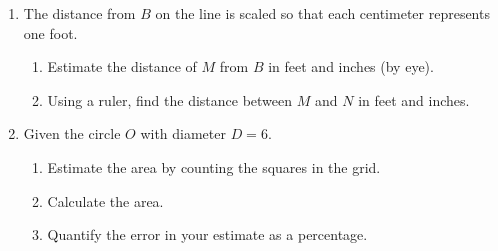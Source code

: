 \documentclass[12pt, twoside]{article}
\begin{document}
\begin{enumerate}
\item The distance from $B$ on the line is scaled so that each centimeter represents one foot. \\[15pt] %
  \begin{enumerate}
    \item Estimate the distance of $M$ from $B$ in feet and inches (by eye). \vspace{1cm} 
    \item Using a ruler, find the distance between $M$ and $N$ in feet and inches. 
  \end{enumerate} \vspace{2cm}

\item Given the circle $O$ with diameter $D=6$.
  \begin{multicols}{2}
    \begin{enumerate}[itemsep=1.5cm]
      \item Estimate the area by counting the squares in the grid.
      \item Calculate the area. 
      \item Quantify the error in your estimate as a percentage.
    \end{enumerate}
  \end{multicols}


\end{enumerate}
\end{document}
